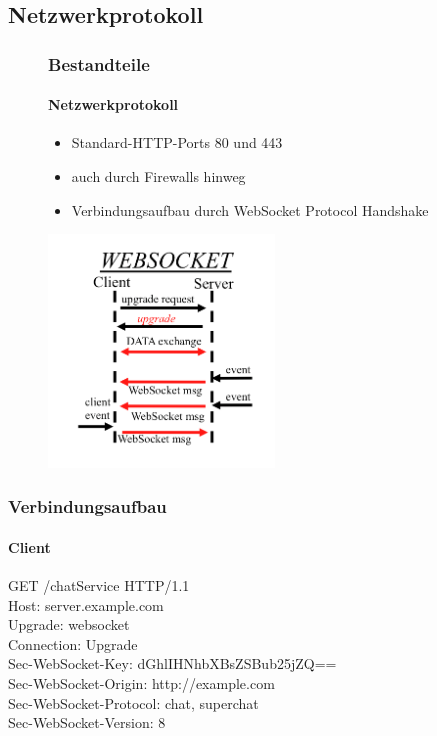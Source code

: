 \documentclass{beamer}
\begin{document}
\subsection{Netzwerkprotokoll}
\begin{frame}
\begin{figure}[htbp]
\frametitle{Bestandteile}
\framesubtitle{Netzwerkprotokoll}
\begin{minipage}[t]{5cm}
\vspace{0pt}
\begin{itemize}
\item Standard-HTTP-Ports 80 und 443
\item auch durch Firewalls hinweg
\item Verbindungsaufbau durch WebSocket Protocol Handshake
\end{itemize}
\end{minipage}
\hfill
\begin{minipage}[t]{6cm}
\vspace{0pt}
\includegraphics[width=6cm]{WebSocket.png}
\end{minipage}
\end{figure}
\end{frame}

\begin{frame}
\frametitle{Verbindungsaufbau}
\framesubtitle{Client}
GET /chatService HTTP/1.1\\
Host: server.example.com\\
Upgrade: websocket\\
Connection: Upgrade\\
Sec-WebSocket-Key: dGhlIHNhbXBsZSBub25jZQ==\\
Sec-WebSocket-Origin: http://example.com\\
Sec-WebSocket-Protocol: chat, superchat\\
Sec-WebSocket-Version: 8 \\
\end{frame}
\end{document}

